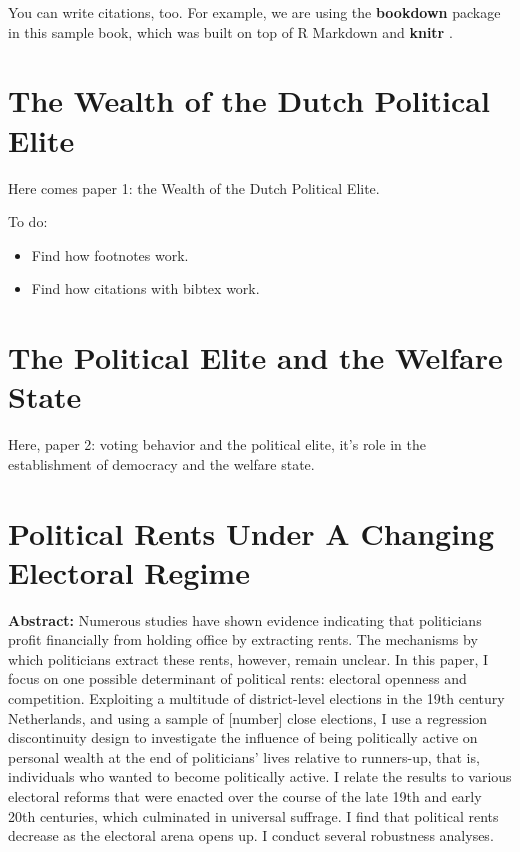 \documentclass[]{book}
\begin{document}
You can write citations, too. For example, we are using the \textbf{bookdown} package \citep{R-bookdown} in this sample book, which was built on top of R Markdown and \textbf{knitr} \citep{xie2015}.

\hypertarget{wodpe}{%
\chapter{The Wealth of the Dutch Political Elite}\label{wodpe}}

Here comes paper 1: the Wealth of the Dutch Political Elite.

To do:

\begin{itemize}
\item
  Find how footnotes work.
\item
  Find how citations with bibtex work.
\end{itemize}

\hypertarget{the-political-elite-and-the-welfare-state}{%
\chapter{The Political Elite and the Welfare State}\label{the-political-elite-and-the-welfare-state}}

Here, paper 2: voting behavior and the political elite, it's role in the establishment of democracy and the welfare state.

\hypertarget{political-rents-under-a-changing-electoral-regime}{%
\chapter{Political Rents Under A Changing Electoral Regime}\label{political-rents-under-a-changing-electoral-regime}}

\textbf{Abstract:}
Numerous studies have shown evidence indicating that politicians profit financially from holding office by extracting rents. The mechanisms by which politicians extract these rents, however, remain unclear. In this paper, I focus on one possible determinant of political rents: electoral openness and competition. Exploiting a multitude of district-level elections in the 19th century Netherlands, and using a sample of {[}number{]} close elections, I use a regression discontinuity design to investigate the influence of being politically active on personal wealth at the end of politicians' lives relative to runners-up, that is, individuals who wanted to become politically active. I relate the results to various electoral reforms that were enacted over the course of the late 19th and early 20th centuries, which culminated in universal suffrage. I find that political rents decrease as the electoral arena opens up. I conduct several robustness analyses.
\end{document}
